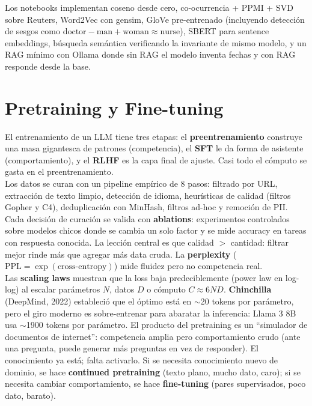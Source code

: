 \documentclass[11pt,a4paper]{article}
\begin{document}
Los notebooks implementan coseno desde cero, co-ocurrencia + PPMI + SVD sobre Reuters, Word2Vec con gensim, GloVe pre-entrenado (incluyendo detecci\'on de sesgos como $\text{doctor} - \text{man} + \text{woman} \approx \text{nurse}$), SBERT para sentence embeddings, b\'usqueda sem\'antica verificando la invariante de mismo modelo, y un RAG m\'inimo con Ollama donde sin RAG el modelo inventa fechas y con RAG responde desde la base. \\[1ex]

\section{Pretraining y Fine-tuning}

El entrenamiento de un LLM tiene tres etapas: el \textbf{preentrenamiento} construye una masa gigantesca de patrones (competencia), el \textbf{SFT} le da forma de asistente (comportamiento), y el \textbf{RLHF} es la capa final de ajuste. Casi todo el c\'omputo se gasta en el preentrenamiento. \\[1ex]

Los datos se curan con un pipeline emp\'irico de 8 pasos: filtrado por URL, extracci\'on de texto limpio, detecci\'on de idioma, heur\'isticas de calidad (filtros Gopher y C4), deduplicaci\'on con MinHash, filtros ad-hoc y remoci\'on de PII. Cada decisi\'on de curaci\'on se valida con \textbf{ablations}: experimentos controlados sobre modelos chicos donde se cambia un solo factor y se mide accuracy en tareas con respuesta conocida. La lecci\'on central es que calidad $>$ cantidad: filtrar mejor rinde m\'as que agregar m\'as data cruda. La \textbf{perplexity} ($\text{PPL} = \exp(\text{cross-entropy})$) mide fluidez pero no competencia real. \\[1ex]

Las \textbf{scaling laws} muestran que la loss baja predeciblemente (power law en log-log) al escalar par\'ametros $N$, datos $D$ o c\'omputo $C \approx 6ND$. \textbf{Chinchilla} (DeepMind, 2022) estableci\'o que el \'optimo est\'a en $\sim$20 tokens por par\'ametro, pero el giro moderno es sobre-entrenar para abaratar la inferencia: Llama 3 8B usa $\sim$1900 tokens por par\'ametro. El producto del pretraining es un ``simulador de documentos de internet'': competencia amplia pero comportamiento crudo (ante una pregunta, puede generar m\'as preguntas en vez de responder). El conocimiento ya est\'a; falta activarlo. Si se necesita conocimiento nuevo de dominio, se hace \textbf{continued pretraining} (texto plano, mucho dato, caro); si se necesita cambiar comportamiento, se hace \textbf{fine-tuning} (pares supervisados, poco dato, barato). \\[1ex]
\end{document}

